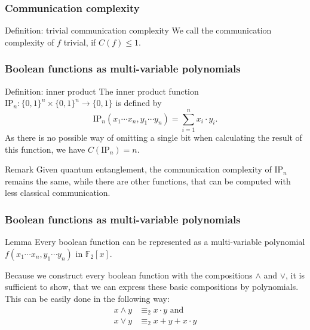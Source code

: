 \documentclass{beamer}
\begin{document}
\begin{frame}\frametitle{Communication complexity}
  \begin{block}{Definition: trivial communication complexity}
    We call the communication complexity of $f$ trivial, if $C(f) \leq 1$.
  \end{block}
\end{frame}

\begin{frame}\frametitle{Boolean functions as multi-variable polynomials}
  \begin{block}{Definition: inner product}
    The inner product function
    $\text{IP}_n: \{ 0, 1 \}^n \times \{ 0, 1 \}^n \to \{ 0, 1 \}$ is defined by
    $$\text{IP}_n(x_1 \cdots x_n, y_1 \cdots y_n) = \sum\limits_{i = 1}^{n}{x_i \cdot y_i} \text{.}$$
    As there is no possible way of omitting a single bit when calculating
    the result of this function, we have $C(\text{IP}_n) = n$.
  \end{block}
  
  \begin{block}{Remark}
    Given quantum entanglement, the communication complexity of $\text{IP}_n$
    remains the same, while there are other functions, that can be computed
    with less classical communication.
  \end{block}
\end{frame}

\begin{frame}\frametitle{Boolean functions as multi-variable polynomials}
  \begin{block}{Lemma}
    Every boolean function can be represented as a multi-variable polynomial
    $f(x_1 \cdots x_n, y_1 \cdots y_n)$ in $\mathbb{F}_2[x]$.
  \end{block}
  
  Because we construct every boolean function with the compositions $\land$ and
  $\lor$, it is sufficient to show, that we can express these basic compositions
  by polynomials.
  This can be easily done in the following way:
  \begin{align*}
    x \land y & \equiv_2 x \cdot y \text{ and} \\
    x \lor y & \equiv_2 x + y + x \cdot y
  \end{align*}
\end{frame}
\end{document}
